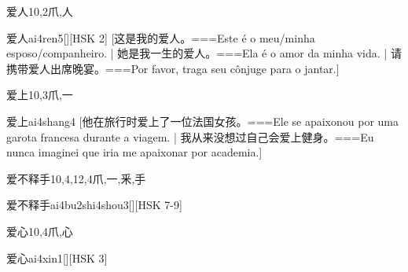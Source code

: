 \begin{Entry}{爱人}{10,2}{⽖,⼈}
  \begin{Phonetics}{爱人}{ai4ren5}[][HSK 2]
    [这是我的爱人。===Este é o meu/minha esposo/companheiro. | 她是我一生的爱人。===Ela é o amor da minha vida. | 请携带爱人出席晚宴。===Por favor, traga seu cônjuge para o jantar.]
  \end{Phonetics}
\end{Entry}

\begin{Entry}{爱上}{10,3}{⽖,⼀}
  \begin{Phonetics}{爱上}{ai4shang4}
    [他在旅行时爱上了一位法国女孩。===Ele se apaixonou por uma garota francesa durante a viagem.  | 我从来没想过自己会爱上健身。===Eu nunca imaginei que iria me apaixonar por academia.]
  \end{Phonetics}
\end{Entry}

\begin{Entry}{爱不释手}{10,4,12,4}{⽖,⼀,⾤,⼿}
  \begin{Phonetics}{爱不释手}{ai4bu2shi4shou3}[][HSK 7-9]
  \end{Phonetics}
\end{Entry}

\begin{Entry}{爱心}{10,4}{⽖,⼼}
  \begin{Phonetics}{爱心}{ai4xin1}[][HSK 3]
  \end{Phonetics}
\end{Entry}

